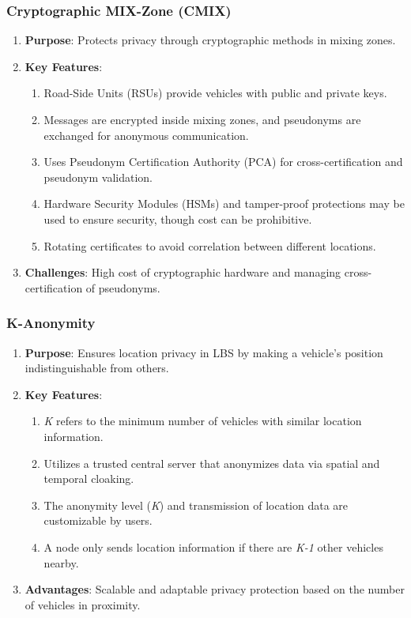 \subsubsection{Cryptographic MIX-Zone (CMIX)}
\begin{enumerate}
    \item \textbf{Purpose}: Protects privacy through cryptographic methods in mixing zones.
    \item \textbf{Key Features}:
    \begin{enumerate}
        \item Road-Side Units (RSUs) provide vehicles with public and private keys.
        \item Messages are encrypted inside mixing zones, and pseudonyms are exchanged for anonymous communication.
        \item Uses Pseudonym Certification Authority (PCA) for cross-certification and pseudonym validation.
        \item Hardware Security Modules (HSMs) and tamper-proof protections may be used to ensure security, though cost can be prohibitive.
        \item Rotating certificates to avoid correlation between different locations.
    \end{enumerate}
    \item \textbf{Challenges}: High cost of cryptographic hardware and managing cross-certification of pseudonyms.
\end{enumerate}

\subsubsection{K-Anonymity}
\begin{enumerate}
    \item \textbf{Purpose}: Ensures location privacy in LBS by making a vehicle’s position indistinguishable from others.
    \item \textbf{Key Features}:
    \begin{enumerate}
        \item \emph{K} refers to the minimum number of vehicles with similar location information.
        \item Utilizes a trusted central server that anonymizes data via spatial and temporal cloaking.
        \item The anonymity level (\emph{K}) and transmission of location data are customizable by users.
        \item A node only sends location information if there are \emph{K-1} other vehicles nearby.
    \end{enumerate}
    \item \textbf{Advantages}: Scalable and adaptable privacy protection based on the number of vehicles in proximity.
\end{enumerate}

